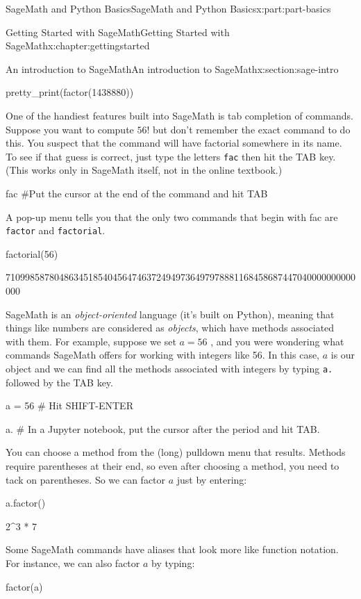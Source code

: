 \documentclass[oneside,10pt,]{book}
\newcommand{\mono}[1]{\texttt{#1}}
\numberwithin{equation}{section}
\begin{document}
\begin{partptx}{SageMath and Python Basics}{}{SageMath and Python Basics}{}{}{x:part:part-basics}
\begin{chapterptx}{Getting Started with SageMath}{}{Getting Started with SageMath}{}{}{x:chapter:gettingstarted}
\begin{sectionptx}{An introduction to SageMath}{}{An introduction to SageMath}{}{}{x:section:sage-intro}
\begin{sageinput}
pretty_print(factor(1438880))
\end{sageinput}
One of the handiest features built into SageMath is tab completion of commands. Suppose you want to compute \(56!\) but don't remember the exact command to do this. You suspect that the command will have factorial somewhere in its name. To see if that guess is correct, just type the letters \mono{fac} then hit the TAB key. (This works only in SageMath itself, not in the online textbook.)%
\begin{sageinput}
fac  #Put the cursor at the end of the command and hit TAB
\end{sageinput}
A pop-up menu tells you that the only two commands that begin with fac are \mono{factor} and \mono{factorial}.%
\begin{sageinput}
factorial(56)
\end{sageinput}
\begin{sageoutput}
710998587804863451854045647463724949736497978881168458687447040000000000000
\end{sageoutput}
SageMath is an \emph{object-oriented} language (it's built on Python), meaning that things like numbers are considered as \emph{objects}, which have methods associated with them. For example, suppose we set \(a=56\) , and you were wondering what commands SageMath offers for working with integers like 56. In this case, \(a\) is our object and we can find all the methods associated with integers by typing \mono{a.} followed by the TAB key.%
\begin{sageinput}
a = 56 # Hit SHIFT-ENTER
\end{sageinput}
\begin{sageinput}
a. # In a Jupyter notebook, put the cursor after the period and hit TAB.
\end{sageinput}
You can choose a method from the (long) pulldown menu that results. Methods require parentheses at their end, so even after choosing a method, you need to tack on parentheses. So we can factor \(a\) just by entering:%
\begin{sageinput}
a.factor()
\end{sageinput}
\begin{sageoutput}
2^3 * 7
\end{sageoutput}
Some SageMath commands have aliases that look more like function notation. For instance, we can also factor \(a\) by typing:%
\begin{sageinput}
factor(a)
\end{sageinput}
\begin{sageoutput}

\end{sageoutput}
\end{sectionptx}
\end{chapterptx}
\end{partptx}
\end{document}
